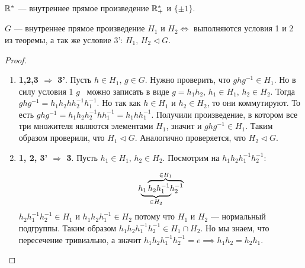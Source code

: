 \documentclass[../main.tex]{subfiles}
\begin{document}
\begin{example}
  $\mathbb{R}^{*}$ --- внутреннее прямое произведение $\mathbb{R}^{*}_{+}$ и $\{\pm 1\}$.
\end{example}

\begin{theorem-non}
  $G$ --- внутреннее прямое произведение $H_1$ и $H_2 \iff$ выполняются условия 1 и 2 из теоремы, а так же условие 3': $H_1,\, H_2 \triangleleft G$.
\end{theorem-non}
\begin{proof}
  \begin{enumerate}
    \item[] \textbf{1,2,3 $\Rightarrow$ 3'}. Пусть $h \in H_1, \, g \in G$. Нужно проверить, что $ghg^{-1} \in H_1$. Но в силу условия 1 $g$~ можно записать в виде $ g = h_1h_2, \, h_1 \in H_1, \, h_2 \in H_2$. Тогда $ghg^{-1} = h_1h_2hh_2^{-1}h_1^{-1}$. Но так как $h \in H_1$ и $h_2 \in H_2$, то они коммутируют. То есть $ghg^{-1} = h_1h_2h_2^{-1}hh_1^{-1} = h_1hh_1^{-1}$. Получили произведение, в котором все три множителя являются элементами $H_1$, значит и $ghg^{-1} \in H_1$. Таким образом проверили, что $H_1 \triangleleft G$. Аналогично проверяется, что $H_2 \triangleleft G$.
    \item[] \textbf{1, 2, 3' $\Rightarrow$ 3}. Пусть $h_1 \in H_1,\, h_2 \in H_2$. Посмотрим на $h_1h_2h_1^{-1}h_2^{-1}$:

  \begin{equation*}
    \rlap{
    $
    \underbrace{\phantom{h_1h_2h_1^{-1}}}_{\mathclap{
      \in H_2
    }}$}
    h_1
    \overbrace{h_2h_1^{-1}h_2^{-1}}^{\mathclap{
      \in H_1
    }}
  \end{equation*}
  $h_2h_1^{-1}h_2^{-1} \in H_1$ и $h_1h_2h_1^{-1} \in H_2$ потому что $H_1$ и $H_2$ --- нормальный подгруппы. Таким образом $h_1h_2h_1^{-1}h_2^{-1} \in H_1 \cap H_2$. Но мы знаем, что пересечение тривиально, а значит $h_1h_2h_1^{-1}h_2^{-1} = e \implies h_1h_2 = h_2h_1$.
  \end{enumerate}
\end{proof}
\end{document}
